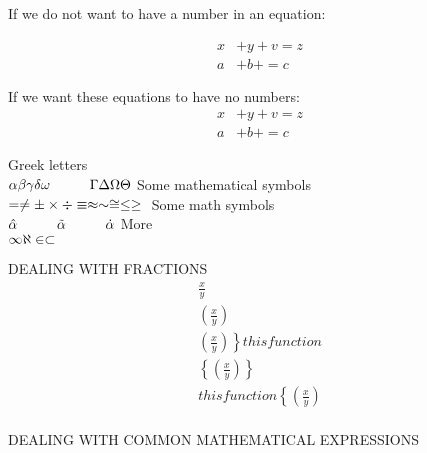 \documentclass{article}
\begin{document}
If we do not want to have a number in an equation:

\begin{align}
x&+y+v=z \nonumber \\
a&+b+=c 
\end{align}

If we want these equations to have no numbers:
\begin{align*}
x&+y+v=z \nonumber \\
a&+b+=c 
\end{align*}


\iffalse
------------------------------------------------------
MATH SYMBOLS AND GREEK LETTERS
- start by creating a mathematical environment using \( and \)
-hspace{1cm} adds horizontal gap of 1 cm
- dot is used for derivative 
------------------------------------------------------
\fi
\noindent Greek letters \\
\(
\alpha \beta \gamma \delta \omega \hspace{1cm}  \Gamma \Delta \Omega \Theta \\
\)
\noindent Some mathematical symbols \\
\(
= \neq \pm \times \div \equiv \approx \sim \cong \leq \geq \\
\)
\noindent Some math symbols \\
\(
\hat{\alpha} \hspace{1cm} \tilde{\alpha} \hspace{1cm} \dot{\alpha} \\
\)
More \\
\(
\noindent \infty \aleph \in \subset \
\)

\vspace{1cm}
DEALING WITH FRACTIONS
 \vspace{1cm}
\begin{align}
	\frac{x}{y} \\
	\left(\frac{x}{y}\right) \\
	\left.\left(\frac{x}{y}\right)\right\} this function \\
	\left\{\left(\frac{x}{y}\right)\right\} \\
	this function \left\{\left(\frac{x}{y}\right)\right. \\
\end{align}

\vspace{2cm}
DEALING WITH COMMON MATHEMATICAL EXPRESSIONS 
\vspace{2cm}
\end{document}
